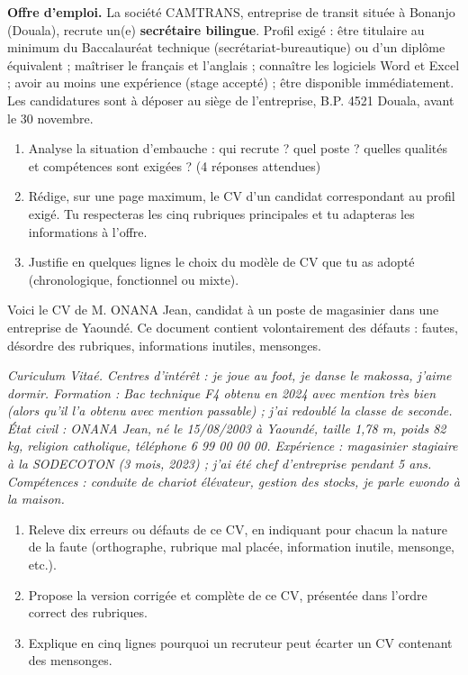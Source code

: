 \documentclass[11pt]{article}
\newcounter{popsec}
\newcounter{popsub}
\newcommand{\courssub}[1]{%
  \stepcounter{popsub}%
  \par\vspace{9pt}\noindent{\popxbold\fontsize{11.5}{13}\selectfont\color{popink}{\color{poporange}\thepopsec.\thepopsub}\hspace{6pt}#1}\par\nopagebreak\vspace{4pt}
}
\begin{document}
\courssub{Je me prépare au Bac}

\begin{exercice}
\textbf{Offre d'emploi.} La société CAMTRANS, entreprise de transit située à Bonanjo (Douala), recrute un(e) \textbf{secrétaire bilingue}. Profil exigé : être titulaire au minimum du Baccalauréat technique (secrétariat-bureautique) ou d'un diplôme équivalent ; maîtriser le français et l'anglais ; connaître les logiciels Word et Excel ; avoir au moins une expérience (stage accepté) ; être disponible immédiatement. Les candidatures sont à déposer au siège de l'entreprise, B.P. 4521 Douala, avant le 30 novembre.

\begin{enumerate}
\item Analyse la situation d'embauche : qui recrute ? quel poste ? quelles qualités et compétences sont exigées ? (4 réponses attendues)
\item Rédige, sur une page maximum, le CV d'un candidat correspondant au profil exigé. Tu respecteras les cinq rubriques principales et tu adapteras les informations à l'offre.
\item Justifie en quelques lignes le choix du modèle de CV que tu as adopté (chronologique, fonctionnel ou mixte).
\end{enumerate}
\end{exercice}

\begin{exercice}
Voici le CV de M. ONANA Jean, candidat à un poste de magasinier dans une entreprise de Yaoundé. Ce document contient volontairement des défauts : fautes, désordre des rubriques, informations inutiles, mensonges.

\emph{Curiculum Vitaé. Centres d'intérêt : je joue au foot, je danse le makossa, j'aime dormir. Formation : Bac technique F4 obtenu en 2024 avec mention très bien (alors qu'il l'a obtenu avec mention passable) ; j'ai redoublé la classe de seconde. État civil : ONANA Jean, né le 15/08/2003 à Yaoundé, taille 1,78 m, poids 82 kg, religion catholique, téléphone 6 99 00 00 00. Expérience : magasinier stagiaire à la SODECOTON (3 mois, 2023) ; j'ai été chef d'entreprise pendant 5 ans. Compétences : conduite de chariot élévateur, gestion des stocks, je parle ewondo à la maison.}

\begin{enumerate}
\item Releve dix erreurs ou défauts de ce CV, en indiquant pour chacun la nature de la faute (orthographe, rubrique mal placée, information inutile, mensonge, etc.).
\item Propose la version corrigée et complète de ce CV, présentée dans l'ordre correct des rubriques.
\item Explique en cinq lignes pourquoi un recruteur peut écarter un CV contenant des mensonges.
\end{enumerate}
\end{exercice}
\end{document}
